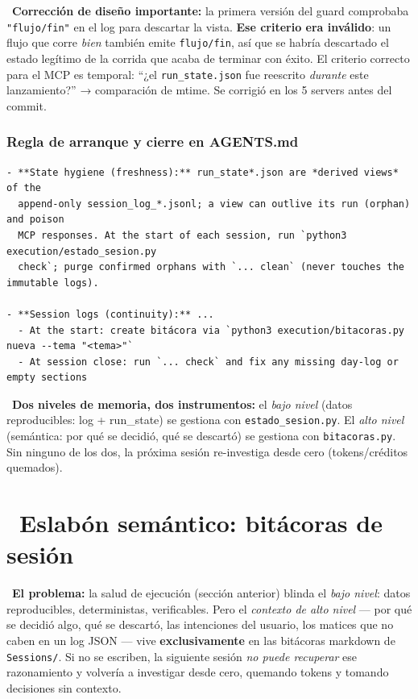 \documentclass[11pt,a4paper]{article}
\newcommand{\iconotexto}[2]{\textcolor{cyanNeon}{\faIcon{#1}}~#2}
\begin{document}
\begin{cajaRecuerda}
~\textbf{Corrección de diseño importante:} la primera
versión del guard comprobaba \texttt{"flujo/fin"} en el log para descartar la vista.
\textbf{Ese criterio era inválido}: un flujo que corre \emph{bien} también emite
\texttt{flujo/fin}, así que se habría descartado el estado legítimo de la corrida que
acaba de terminar con éxito. El criterio correcto para el MCP es temporal:
``¿el \texttt{run\_state.json} fue reescrito \emph{durante} este lanzamiento?''
→ comparación de mtime. Se corrigió en los 5 servers antes del commit.
\end{cajaRecuerda}

\subsubsection{Regla de arranque y cierre en AGENTS.md}
\begin{lstlisting}
- **State hygiene (freshness):** run_state*.json are *derived views* of the
  append-only session_log_*.jsonl; a view can outlive its run (orphan) and poison
  MCP responses. At the start of each session, run `python3 execution/estado_sesion.py
  check`; purge confirmed orphans with `... clean` (never touches the immutable logs).

- **Session logs (continuity):** ...
  - At the start: create bitácora via `python3 execution/bitacoras.py nueva --tema "<tema>"`
  - At session close: run `... check` and fix any missing day-log or empty sections
\end{lstlisting}

\begin{cajaConcepto}
~\textbf{Dos niveles de memoria, dos instrumentos:}
el \emph{bajo nivel} (datos reproducibles: log + run\_state) se gestiona con
\texttt{estado\_sesion.py}. El \emph{alto nivel} (semántica: por qué se decidió,
qué se descartó) se gestiona con \texttt{bitacoras.py}. Sin ninguno de los dos, la
próxima sesión re-investiga desde cero (tokens/créditos quemados).
\end{cajaConcepto}

\section{\iconotexto{book}{Eslabón semántico: bitácoras de sesión}}

\begin{cajaConcepto}
~\textbf{El problema:} la salud de ejecución (sección anterior) blinda
el \emph{bajo nivel}: datos reproducibles, deterministas, verificables. Pero el
\emph{contexto de alto nivel} — por qué se decidió algo, qué se descartó, las
intenciones del usuario, los matices que no caben en un log JSON — vive
\textbf{exclusivamente} en las bitácoras markdown de \texttt{Sessions/}. Si no se
escriben, la siguiente sesión \emph{no puede recuperar} ese razonamiento y volvería
a investigar desde cero, quemando tokens y tomando decisiones sin contexto.
\end{cajaConcepto}
\end{document}

